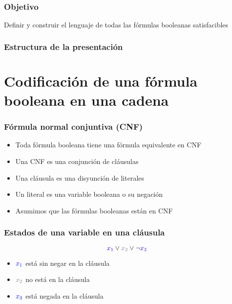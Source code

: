 \documentclass{beamer}
\begin{document}
\begin{frame}
    \frametitle{Objetivo}
    
    Definir y construir el lenguaje de todas las fórmulas booleanas satisfacibles    
\end{frame}

\begin{frame}
    \frametitle{Estructura de la presentación}
    
    \tableofcontents
\end{frame}

\section{Codificación de una fórmula booleana en una cadena}
\begin{frame}
    \frametitle{Fórmula normal conjuntiva (CNF)}
    
    \begin{itemize}
        \item Toda fórmula booleana tiene una fórmula equivalente en CNF
              \pause
        \item Una CNF es una conjunción de cláusulas
              \pause
        \item Una cláusula es una disyunción de literales
              \pause
        \item Un literal es una variable booleana o su negación
              \pause
        \item Asumimos que las fórmulas booleanas están en CNF
    \end{itemize}
    
\end{frame}

\begin{frame}

    \frametitle{Estados de una variable en una cláusula}
    
    \begin{Large}    
        $$\textcolor{blue}{x_1}\vee \textcolor{gray}{x_2}\vee \neg \textcolor{blue}{x_3}$$
    \end{Large}
    
    \pause
    \vspace{1cm}
    \begin{itemize}
        \item  $\textcolor{blue}{x_1}$ está sin negar en la cláusula
              \pause
        \item  $\textcolor{gray}{x_2}$ no está en la cláusula
              \pause
        \item $\textcolor{blue}{x_3}$ está negada en la cláusula
    \end{itemize}
\end{frame}
\end{document}
